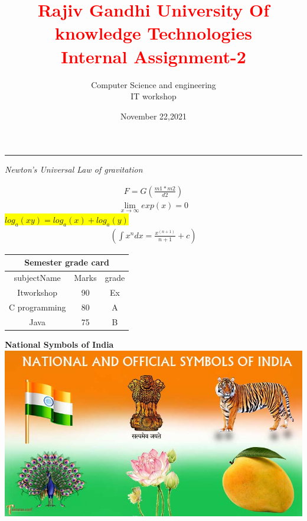 \documentclass[a4paper]{article}
\title{\textbf{\textcolor{red}{Rajiv Gandhi University Of knowledge Technologies\\Internal Assignment-2}}}
\author{Computer Science and engineering\\IT workshop}
\date{November 22,2021}
\begin{document}
\maketitle
\vspace{1mm}
\hrule
\vspace{2mm}
\textsl{Newton's Universal Law of gravitation}
\begin{center}
\begin{eqnarray}
F=G(\frac{m1*m2}{d2})
\end{eqnarray}
\begin{eqnarray}
\lim\limits_{x \to \infty}exp(x)=0
\end{eqnarray}
\colorbox{yellow}{$log_a(xy)=log_a(x)+log_a(y)$}
\begin{eqnarray}
\left (\int x^ndx=\frac{x^{(n+1)}}{n+1}+c\right)
\end{eqnarray}
\end{center}
\begin{flushleft}
\vspace{2mm}
\begin{tabular}{|c|c|c|}
\hline
\multicolumn{3}{|c|}{\textbf{Semester grade card}}\\
\hline
subjectName & Marks & grade\\
\hline
Itworkshop & 90 & Ex\\
\hline
C programming & 80& A\\
\hline
Java & 75 & B\\
\hline
\end{tabular}
\end{flushleft}
\begin{center}
\large{\textbf{National Symbols of India}}\\
\vspace{2mm}
\includegraphics[scale=0.5]{india}
\end{center}
\end{document}
